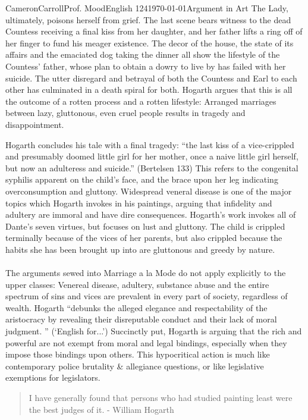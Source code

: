 \documentclass[12pt,letterpaper]{article}
\begin{document}
\begin{mla}{Cameron}{Carroll}{Prof. Mood}{English 124}{\today}{Argument in Art}
The Lady, ultimately, poisons herself from grief. The last scene bears witness to the dead Countess receiving a final kiss from her daughter, and her father lifts a ring off of her finger to fund his meager existence. The decor of the house, the state of its affairs and the emaciated dog taking the dinner all show the lifestyle of the Countess' father, whose plan to obtain a dowry to live by has failed with her suicide. The utter disregard and betrayal of both the Countess and Earl to each other has culminated in a death spiral for both. Hogarth argues that this is all the outcome of a rotten process and a rotten lifestyle: Arranged marriages between lazy, gluttonous, even cruel people results in tragedy and disappointment. 

Hogarth concludes his tale with a final tragedy: ``the last kiss of a vice-crippled and presumably doomed little girl for her mother, once a naive little girl herself, but now an adulteress and suicide.'' (Bertelsen 133) This refers to the congenital syphilis apparent on the child's face, and the brace upon her leg indicating overconsumption and gluttony. Widespread veneral disease is one of the major topics which Hogarth invokes in his paintings, arguing that infidelity and adultery are immoral and have dire consequences.   Hogarth's work invokes all of Dante's seven virtues, but focuses on lust and gluttony. The child is crippled terminally because of the vices of her parents, but also crippled because the habits she has been brought up into are gluttonous and greedy by nature.

\paragraph{} The arguments sewed into Marriage a la Mode do not apply explicitly to the upper classes: Venereal disease, adultery, substance abuse and the entire spectrum of sins and vices are prevalent in every part of society, regardless of wealth. Hogarth ``debunks the alleged elegance and respectability of the aristocracy by revealing their disreputable conduct and their lack of moral judgment. '' (`English for...') Succinctly put, Hogarth is arguing that the rich and powerful are not exempt from moral and legal bindings, especially when they impose those bindings upon others. This hypocritical action is much like contemporary police brutality \& allegiance questions, or like legislative exemptions for legislators.

\begin{quote}
I have generally found that persons who had studied painting least were the best judges of it. - William Hogarth
\end{quote}


\end{mla}
\end{document}
